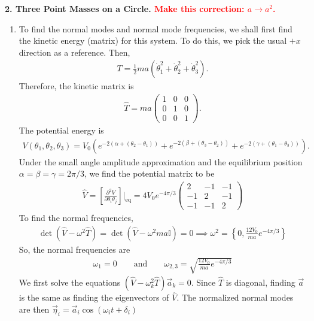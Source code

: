 \documentclass{article}
\theoremstyle{definition}
\newcommand{\p}{\partial}
\newcommand{\al}{\alpha}
\newcommand{\be}{\beta}
\newcommand{\f}[2]{\frac{#1}{#2}}
\newcommand{\lp}{\left(}
\newcommand{\rp}{\right)}
\newcommand{\lb}{\left[}
\newcommand{\rb}{\right]}
\newcommand{\lc}{\left\{}
\newcommand{\rc}{\right\}}
\begin{document}
\noindent \textbf{2. Three Point Masses on a Circle. \textcolor{red}{Make this correction: $a\to a^2$. }} 
\begin{enumerate}[label=(\alph*)] 
	\item 	To find the normal modes and normal mode frequencies, we shall first find the kinetic energy (matrix) for this system. To do this, we pick the usual $+x$ direction as a reference. Then,
	\begin{align*}
	T = \f{1}{2}ma \lp \dot \theta_1^2 + \dot \theta_2^2 + \dot \theta_3^2 \rp.
	\end{align*}
	Therefore, the kinetic matrix is 
	\begin{align*}
	\hat T = ma \begin{pmatrix}
	1 & 0 & 0 \\ 0 & 1 & 0 \\ 0 & 0 & 1
	\end{pmatrix}.
	\end{align*}
	The potential energy is 
	\begin{align*}
	V(\theta_1,\theta_2,\theta_3) = V_0\lp e^{-2(\al + (\theta_2 - \theta_1))} + e^{-2(\be + (\theta_3 - \theta_2))}+ e^{-2(\gamma +  (\theta_1 - \theta_3))} \rp.
	\end{align*}
	Under the small angle amplitude approximation and the equilibrium position $\al=\be=\gamma = 2\pi/3$, we find the potential matrix to be 
	\begin{align*}
	\hat V = \lb \f{\p^2 V}{\p \theta_i \theta_j} \rb\bigg\vert_{\text{eq}} = 
	4V_0e^{-4\pi/3}\begin{pmatrix}
	2&-1&-1\\
	-1&2&-1\\
	-1&-1&2
	\end{pmatrix}
	\end{align*}
	To find the normal frequencies,
	\begin{align*}
	\det(\hat V - \omega^2 \hat T ) = \det(\hat V - \omega^2 ma \mathbb{I}) = 0 \implies \omega^2 = \lc 0, \f{12V_0}{ma}e^{-4\pi/3} \rc
	\end{align*}
	So, the normal frequencies are 
	\begin{align*}
	\boxed{\omega_1 = 0} \quad \quad \text{and} \quad\quad \boxed{\omega_{2,3} = \sqrt{\f{12 V_0}{ma} e^{-4\pi/3}}}
	\end{align*}
	We first solve the equations $(\hat V - \omega_k^2 \hat T)\vec{a}_k = 0$. Since $\hat T$ is diagonal, finding $\vec{a}$ is the same as finding the eigenvectors of $\hat V$. The normalized normal modes are then $\vec{\eta}_i = \vec{a}_i\cos(\omega_i t + \delta_i)$

\end{enumerate}
\end{document}
